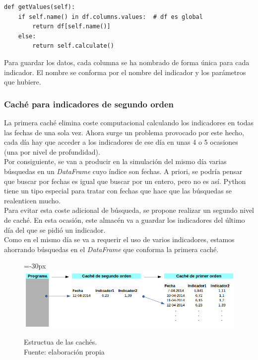 \begin{lstlisting}
def getValues(self):
	if self.name() in df.columns.values:  # df es global
		return df[self.name()]
	else:
		return self.calculate()
\end{lstlisting}

Para guardar los datos, cada columna se ha nombrado de forma \'unica para cada indicador. El nombre se conforma por el nombre del indicador y los par\'ametros que hubiere.\\

\subsubsection{Cach\'e para indicadores de segundo orden}

La primera cach\'e elimina coste computacional calculando los indicadores en todas las fechas de una sola vez. Ahora surge un problema provocado por este hecho, cada d\'ia hay que acceder a los indicadores de ese d\'ia en unas 4 o 5 ocasiones (una por nivel de profundidad).\\

Por consiguiente, se van a producir en la simulaci\'on del mismo d\'ia varias b\'usquedas en un \textit{DataFrame} cuyo \'indice son fechas. A priori, se podr\'ia pensar que buscar por fechas es igual que buscar por un entero, pero no es as\'i. Python tiene un tipo especial para tratar con fechas que hace que las b\'usquedas se realenticen mucho.\\

Para evitar esta coste adicional de b\'usqueda, se propone realizar un segundo nivel de cach\'e. En esta ocasi\'on, este almac\'en va a guardar los indicadores del \'ultimo d\'ia del que se pidi\'o un indicador. \\

Como en el mismo d\'ia se va a requerir el uso de varios indicadores, estamos ahorrando b\'usquedas en el \textit{DataFrame} que conforma la primera cach\'e.\\

     	\begin{figure}[H]
    		\centering\leftskip=-30px
    		\includegraphics[scale=0.60]{imagenes/caches.png}
    	    \caption[Estructura de las cach\'es]{Estructua de las cach\'es.\\ Fuente: elaboraci\'on propia}
    		\label{fig:caches}
	   \end{figure}
	   
